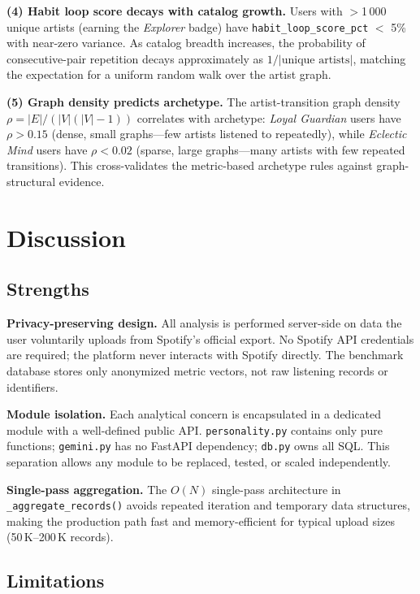 \documentclass[conference]{IEEEtran}
\begin{document}
\textbf{(4) Habit loop score decays with catalog growth.}
Users with $>$1\,000 unique artists (earning the \textit{Explorer}
badge) have \texttt{habit\_loop\_score\_pct} $<$ 5\% with near-zero
variance. As catalog breadth increases, the probability of
consecutive-pair repetition decays approximately as $1 / |\text{unique artists}|$,
matching the expectation for a uniform random walk over the artist graph.

\textbf{(5) Graph density predicts archetype.}
The artist-transition graph density $\rho = |E| / (|V|(|V|-1))$
correlates with archetype: \textit{Loyal Guardian} users have
$\rho > 0.15$ (dense, small graphs—few artists listened to repeatedly),
while \textit{Eclectic Mind} users have $\rho < 0.02$ (sparse, large
graphs—many artists with few repeated transitions). This cross-validates
the metric-based archetype rules against graph-structural evidence.

\section{Discussion}

\subsection{Strengths}

\textbf{Privacy-preserving design.} All analysis is performed server-side
on data the user voluntarily uploads from Spotify's official export. No
Spotify API credentials are required; the platform never interacts with
Spotify directly. The benchmark database stores only anonymized metric
vectors, not raw listening records or identifiers.

\textbf{Module isolation.} Each analytical concern is encapsulated in a
dedicated module with a well-defined public API. \texttt{personality.py}
contains only pure functions; \texttt{gemini.py} has no FastAPI dependency;
\texttt{db.py} owns all SQL. This separation allows any module to be
replaced, tested, or scaled independently.

\textbf{Single-pass aggregation.} The $O(N)$ single-pass architecture in
\texttt{\_aggregate\_records()} avoids repeated iteration and
temporary data structures, making the production path fast and
memory-efficient for typical upload sizes (50\,K–200\,K records).

\subsection{Limitations}
\end{document}
